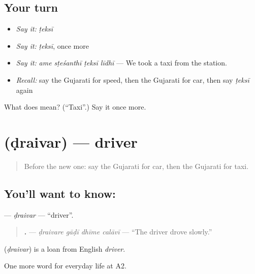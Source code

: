 \subsection*{Your turn}
\begin{itemize}
\raggedright
  \item \emph{Say it:} \emph{ṭeksī}
  \item \emph{Say it:} \emph{ṭeksī}, once more
  \item \emph{Say it:} \emph{ame sṭeśanthī ṭeksī līdhī} — We took a taxi from the station.
  \item \emph{Recall:} say the Gujarati for speed, then the Gujarati for car, then say \emph{ṭeksī} again
\end{itemize}

\begin{tcolorbox}[breakable,colback=teal!4,colframe=teal!35!black,title={Before you move on}]
What does  mean? (\textquotedblleft{}Taxi\textquotedblright{}.) Say it once more.
\end{tcolorbox}
\section[\texorpdfstring{\gu{ડ્રાઈવર} (ḍraivar)}{ડ્રાઈવર (ḍraivar)}]{ (ḍraivar) — driver}

\label{lesson:GU-C207-draivar}



\begin{quote}
Before the new one: say the Gujarati for car, then the Gujarati for taxi.
\end{quote}

\subsection*{You'll want to know: }
\textbf{} — \emph{ḍraivar} — \textquotedblleft{}driver\textquotedblright{}.

\begin{quote}
\textbf{   .} — \emph{ḍraivare gāḍī dhīme calāvī} — \textquotedblleft{}The driver drove slowly.\textquotedblright{}
\end{quote}

\begin{cousinweb}
\textbf{} (\emph{ḍraivar}) is a loan from English \emph{driver}.
\end{cousinweb}

\begin{grammarlens}[title={What you've built}]
One more word for everyday life at A2.
\end{grammarlens}

